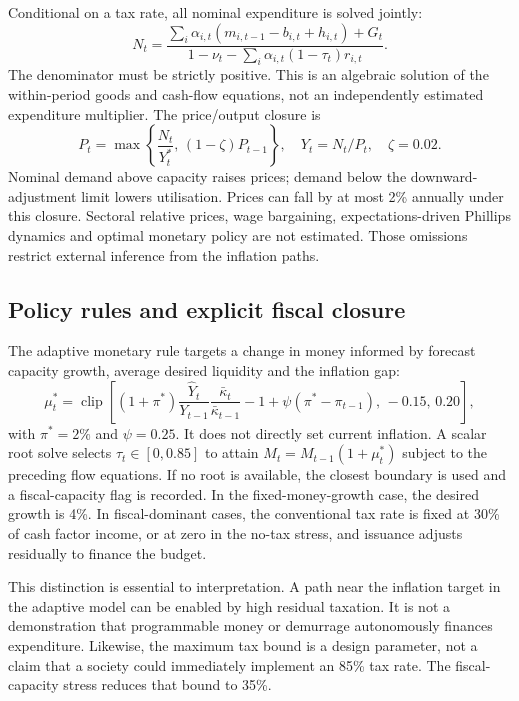 Conditional on a tax rate, all nominal expenditure is solved jointly:
\begin{equation}
N_t=\frac{\sum_i\alpha_{i,t}(m_{i,t-1}-b_{i,t}+h_{i,t})+G_t}
{1-\nu_t-\sum_i\alpha_{i,t}(1-\tau_t)r_{i,t}}.\label{eq:nominal}
\end{equation}
The denominator must be strictly positive. This is an algebraic solution of the within-period goods and cash-flow equations, not an independently estimated expenditure multiplier. The price/output closure is
\begin{equation}
P_t=\max\left\{\frac{N_t}{Y_t^*},\,(1-\zeta)P_{t-1}\right\},\quad
Y_t=N_t/P_t,\quad\zeta=0.02.\label{eq:prices}
\end{equation}
Nominal demand above capacity raises prices; demand below the downward-adjustment limit lowers utilisation. Prices can fall by at most 2\% annually under this closure. Sectoral relative prices, wage bargaining, expectations-driven Phillips dynamics and optimal monetary policy are not estimated. Those omissions restrict external inference from the inflation paths.

\subsection{Policy rules and explicit fiscal closure}
The adaptive monetary rule targets a change in money informed by forecast capacity growth, average desired liquidity and the inflation gap:
\begin{equation}
\mu_t^*=\operatorname{clip}\left[(1+\pi^*)\frac{\widehat Y_t}{Y_{t-1}}
\frac{\bar\kappa_t}{\bar\kappa_{t-1}}-1+\psi(\pi^*-\pi_{t-1}),\,-0.15,\,0.20\right],
\end{equation}
with $\pi^*=2\%$ and $\psi=0.25$. It does not directly set current inflation. A scalar root solve selects $\tau_t\in[0,0.85]$ to attain $M_t=M_{t-1}(1+\mu_t^*)$ subject to the preceding flow equations. If no root is available, the closest boundary is used and a fiscal-capacity flag is recorded. In the fixed-money-growth case, the desired growth is 4\%. In fiscal-dominant cases, the conventional tax rate is fixed at 30\% of cash factor income, or at zero in the no-tax stress, and issuance adjusts residually to finance the budget.

This distinction is essential to interpretation. A path near the inflation target in the adaptive model can be enabled by high residual taxation. It is not a demonstration that programmable money or demurrage autonomously finances expenditure. Likewise, the maximum tax bound is a design parameter, not a claim that a society could immediately implement an 85\% tax rate. The fiscal-capacity stress reduces that bound to 35\%.

